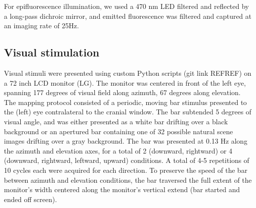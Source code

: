 For epifluorescence illumination, we used a 470 nm LED filtered and reflected by a long-pass dichroic mirror, and emitted fluorescence was filtered and captured at an imaging rate of 25Hz. 

\subsection{Visual stimulation}
Visual stimuli were presented using custom Python scripts (git link REFREF) on a 72 inch LCD monitor (LG). The monitor was centered in front of the left eye, spanning 177 degrees of visual field along azimuth, 67 degrees along elevation. The mapping protocol consisted of a periodic, moving bar stimulus \cite{Kalatsky2003, Marshel2011} presented to the (left) eye contralateral to the cranial window. The bar subtended 5 degrees of visual angle, and was either presented as a white bar drifting over a black background or an apertured bar containing one of 32 possible natural scene images drifting over a gray background. The bar was presented at 0.13 Hz along the azimuth and elevation axes, for a total of 2 (downward, rightward) or 4 (downward, rightward, leftward, upward) conditions. A total of 4-5 repetitions of 10 cycles each were acquired for each direction. To preserve the speed of the bar between azimuth and elevation conditions, the bar traversed the full extent of the monitor's width centered along the monitor's vertical extend (bar started and ended off screen). 

